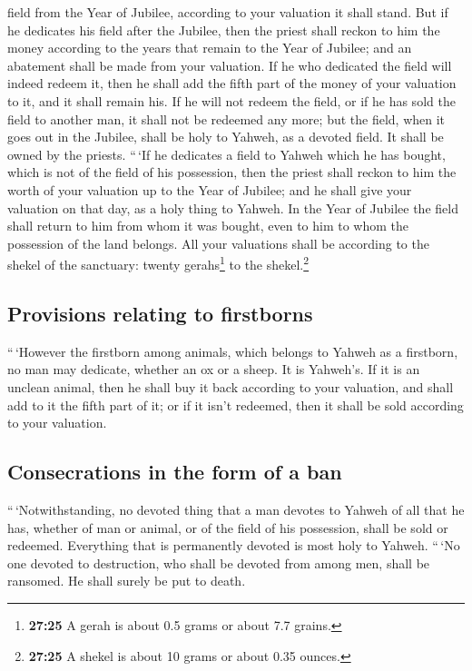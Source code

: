 field from the Year of Jubilee, according to your valuation it shall
stand.  But if he dedicates his field after the Jubilee,
then the priest shall reckon to him the money according to the years
that remain to the Year of Jubilee; and an abatement shall be made from
your valuation.  If he who dedicated the field will
indeed redeem it, then he shall add the fifth part of the money of your
valuation to it, and it shall remain his.  If he will not
redeem the field, or if he has sold the field to another man, it shall
not be redeemed any more;  but the field, when it goes
out in the Jubilee, shall be holy to Yahweh, as a devoted field. It
shall be owned by the priests.  ``\,`If he dedicates a
field to Yahweh which he has bought, which is not of the field of his
possession,  then the priest shall reckon to him the
worth of your valuation up to the Year of Jubilee; and he shall give
your valuation on that day, as a holy thing to Yahweh. 
In the Year of Jubilee the field shall return to him from whom it was
bought, even to him to whom the possession of the land belongs.
 All your valuations shall be according to the shekel of
the sanctuary: twenty gerahs\footnote{\textbf{27:25} A gerah is about
  0.5 grams or about 7.7 grains.} to the shekel.\footnote{\textbf{27:25}
  A shekel is about 10 grams or about 0.35 ounces.}

\hypertarget{provisions-relating-to-firstborns}{%
\subsection{Provisions relating to
firstborns}\label{provisions-relating-to-firstborns}}

 ``\,`However the firstborn among animals, which belongs
to Yahweh as a firstborn, no man may dedicate, whether an ox or a sheep.
It is Yahweh's.  If it is an unclean animal, then he
shall buy it back according to your valuation, and shall add to it the
fifth part of it; or if it isn't redeemed, then it shall be sold
according to your valuation.

\hypertarget{consecrations-in-the-form-of-a-ban}{%
\subsection{Consecrations in the form of a
ban}\label{consecrations-in-the-form-of-a-ban}}

 ``\,`Notwithstanding, no devoted thing that a man
devotes to Yahweh of all that he has, whether of man or animal, or of
the field of his possession, shall be sold or redeemed. Everything that
is permanently devoted is most holy to Yahweh.  ``\,`No
one devoted to destruction, who shall be devoted from among men, shall
be ransomed. He shall surely be put to death.

